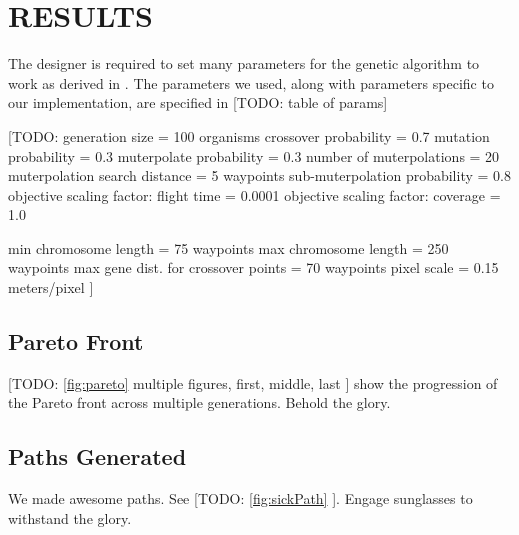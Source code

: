 \documentclass[letterpaper, 10 pt, conference]{ieeeconf}  %
\newcommand{\todo}[1]{{\color{blue}[TODO: #1]}}
\begin{document}
\section{RESULTS}\label{results}

The designer is required to set many parameters for the genetic algorithm to work as derived in \cite{Parkinson2019}. The parameters we used, along with parameters specific to our implementation, are specified in \todo{table of params}

\todo{
generation size = 100 organisms
crossover probability = 0.7
mutation probability = 0.3
muterpolate probability = 0.3
number of muterpolations = 20
muterpolation search distance = 5 waypoints
sub-muterpolation probability = 0.8
objective scaling factor: flight time = 0.0001
objective scaling factor: coverage = 1.0

min chromosome length = 75 waypoints
max chromosome length = 250 waypoints
max gene dist. for crossover points = 70 waypoints
pixel scale = 0.15 meters/pixel
}

\subsection{Pareto Front}

\todo{ \ref{fig:pareto} multiple figures, first, middle, last } show the progression of the Pareto front across multiple generations. Behold the glory.

\subsection{Paths Generated}

We made awesome paths. See \todo{ \ref{fig:sickPath} }. Engage sunglasses to withstand the glory.



\end{document}
